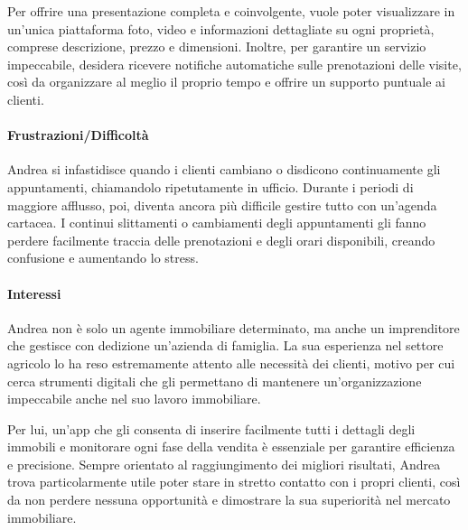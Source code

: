 Per offrire una presentazione completa e coinvolgente, vuole poter visualizzare in un’unica piattaforma foto, video e informazioni dettagliate su ogni proprietà, comprese descrizione, prezzo e dimensioni. Inoltre, per garantire un servizio impeccabile, desidera ricevere notifiche automatiche sulle prenotazioni delle visite, così da organizzare al meglio il proprio tempo e offrire un supporto puntuale ai clienti.

\paragraph{Frustrazioni/Difficoltà}
Andrea si infastidisce quando i clienti cambiano o disdicono continuamente gli appuntamenti, chiamandolo ripetutamente in ufficio. Durante i periodi di maggiore afflusso, poi, diventa ancora più difficile gestire tutto con un’agenda cartacea.
I continui slittamenti o cambiamenti degli appuntamenti gli fanno perdere facilmente traccia delle prenotazioni e degli orari disponibili, creando confusione e aumentando lo stress.

\paragraph{Interessi}
Andrea non è solo un agente immobiliare determinato, ma anche un imprenditore che gestisce con dedizione un’azienda di famiglia. La sua esperienza nel settore agricolo lo ha reso estremamente attento alle necessità dei clienti, motivo per cui cerca strumenti digitali che gli permettano di mantenere un’organizzazione impeccabile anche nel suo lavoro immobiliare.

Per lui, un’app che gli consenta di inserire facilmente tutti i dettagli degli immobili e monitorare ogni fase della vendita è essenziale per garantire efficienza e precisione. Sempre orientato al raggiungimento dei migliori risultati, Andrea trova particolarmente utile poter stare in stretto contatto con i propri clienti, così da non perdere nessuna opportunità e dimostrare la sua superiorità nel mercato immobiliare.

